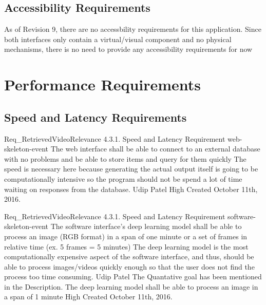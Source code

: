 \documentclass{scrreprt}
\begin{document}
\subsection{Accessibility Requirements}

As of Revision 9, there are no accessbility requirements for this application.
Since both interfaces only contain a virtual/visual component and no physical
mechanisms, there is no need to provide any accessibility requirements for now

\section{Performance Requirements}

\subsection{Speed and Latency Requirements}
\label{req-speed-latency}

\requirement
{Req_RetrievedVideoRelevance}
{4.3.1. Speed and Latency Requirement}
{web-skeleton-event}
{The web interface shall be able to connect to an external database with no problems and be able to store items and query for them quickly }
{The speed is necessary here because generating the actual output itself is going to be computationally intensive so the program should not be spend a lot of time waiting on responses from the database.}
{Udip Patel}
{High}
{Created October 11th, 2016.}

\requirement
{Req_RetrievedVideoRelevance}
{4.3.1. Speed and Latency Requirement}
{software-skeleton-event}
{The software interface's deep learning model shall be able to process an image (RGB format) in a span of one minute or a set of frames in relative time (ex. 5 frames = 5 minutes)}
{The deep learning model is the most computationally expensive aspect of the software interface, and thus, should be able to process images/videos quickly enough so that the user does not find the process too time consuming.}
{Udip Patel}
{The Quantative goal has been mentioned in the Description. The deep learning model shall be able to process an image in a span of 1 minute}
{High}
{Created October 11th, 2016.}
\end{document}
